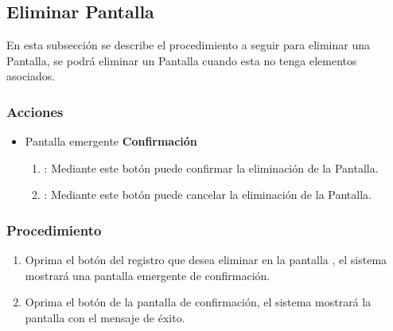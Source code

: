 \subsection{Eliminar Pantalla}

En esta subsección se describe el procedimiento a seguir para eliminar una Pantalla, se podrá eliminar un Pantalla cuando esta no tenga elementos asociados.

\subsubsection{Acciones}
\begin{itemize}
  \item Pantalla emergente \textbf{Confirmación}
  \begin{enumerate}
	\item {}: Mediante este botón puede confirmar la eliminación de la Pantalla.
	\item {}: Mediante este botón puede cancelar la eliminación de la Pantalla.
  \end{enumerate}
\end{itemize}

\subsubsection{Procedimiento}
\begin{enumerate}
	\item Oprima el botón \btnEliminar del registro que desea eliminar en la pantalla , el sistema mostrará una pantalla emergente de confirmación.
	
	\item Oprima el botón  de la pantalla de confirmación, el sistema mostrará la pantalla  con el mensaje de éxito.
\end{enumerate}

